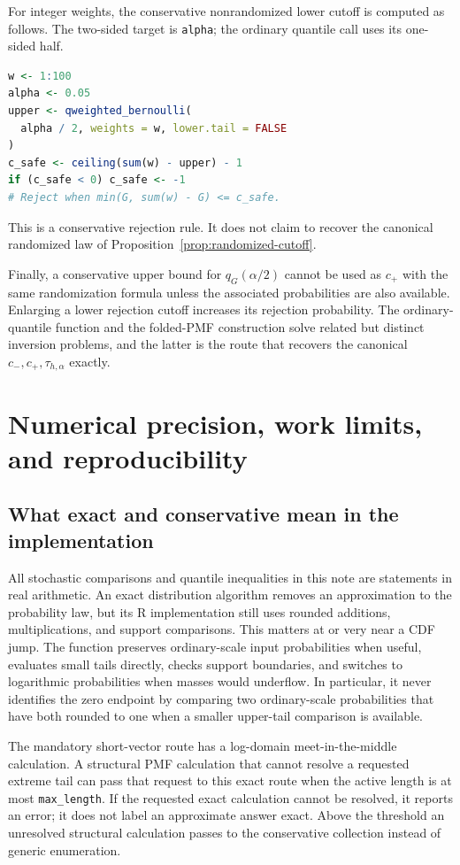\documentclass[11pt,letterpaper]{article}
\numberwithin{equation}{section}
\theoremstyle{definition}
\theoremstyle{remark}
\begin{document}
For integer weights, the conservative nonrandomized lower cutoff is computed
as follows. The two-sided target is \texttt{alpha}; the ordinary quantile
call uses its one-sided half.
\begin{lstlisting}[language=R]
w <- 1:100
alpha <- 0.05
upper <- qweighted_bernoulli(
  alpha / 2, weights = w, lower.tail = FALSE
)
c_safe <- ceiling(sum(w) - upper) - 1
if (c_safe < 0) c_safe <- -1
# Reject when min(G, sum(w) - G) <= c_safe.
\end{lstlisting}
This is a conservative rejection rule. It does not claim to recover the
canonical randomized law of Proposition~\ref{prop:randomized-cutoff}.

Finally, a conservative upper bound for $q_G(\alpha/2)$ cannot be used
as $c_+$ with the same randomization formula unless the associated
probabilities are also available.  Enlarging a lower rejection cutoff
increases its rejection probability.  The ordinary-quantile function
and the folded-PMF construction solve related but distinct inversion
problems, and the latter is the route that recovers the canonical
$c_-,c_+,\tau_{h,\alpha}$ exactly.

\section{Numerical precision, work limits, and reproducibility}
\label{sec:numerical-resources}

\subsection{What exact and conservative mean in the implementation}

All stochastic comparisons and quantile inequalities in this note are
statements in real arithmetic. An exact distribution algorithm removes
an approximation to the probability law, but its R implementation still
uses rounded additions, multiplications, and support comparisons. This
matters at or very near a CDF jump. The function preserves ordinary-scale
input probabilities when useful, evaluates small tails directly, checks
support boundaries, and switches to logarithmic probabilities when masses
would underflow. In particular, it never identifies the zero endpoint by
comparing two ordinary-scale probabilities that have both rounded to one
when a smaller upper-tail comparison is available.

The mandatory short-vector route has a log-domain meet-in-the-middle
calculation. A structural PMF calculation that cannot resolve a requested
extreme tail can pass that request to this exact route when the active
length is at most \texttt{max\_length}. If the requested exact calculation
cannot be resolved, it reports an error; it does not label an approximate
answer exact. Above the threshold an unresolved structural calculation
passes to the conservative collection instead of generic enumeration.
\end{document}
